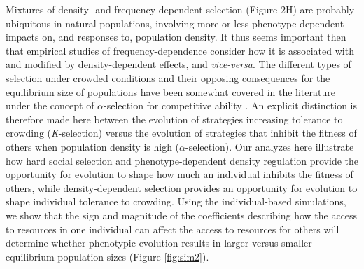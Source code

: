 \documentclass{article}
\begin{document}
Mixtures of density- and frequency-dependent selection (Figure 2H) are probably ubiquitous in natural populations, involving more or less phenotype-dependent impacts on, and responses to, population density. It thus seems important then that empirical studies of frequency-dependence consider how it is associated with and modified by density-dependent effects, and \textit{vice-versa}. The different types of selection under crowded conditions and their opposing consequences for the equilibrium size of populations have been somewhat covered in the literature under the concept of ${\alpha}$-selection for competitive ability \citep{Joshi2001}. An explicit distinction is therefore made here between the evolution of strategies increasing tolerance to crowding (\textit{K}-selection) versus the evolution of strategies that inhibit the fitness of others when population density is high (${\alpha}$-selection). Our analyzes here illustrate how hard social selection and phenotype-dependent density regulation provide the opportunity for evolution to shape how much an individual inhibits the fitness of others, while density-dependent selection provides an opportunity for evolution to shape individual tolerance to crowding. Using the individual-based simulations, we show that the sign and magnitude of the coefficients describing how the access to resources in one individual can affect the access to resources for others will determine whether phenotypic evolution results in larger versus smaller equilibrium population sizes (Figure \ref{fig:sim2}). 
\end{document}
